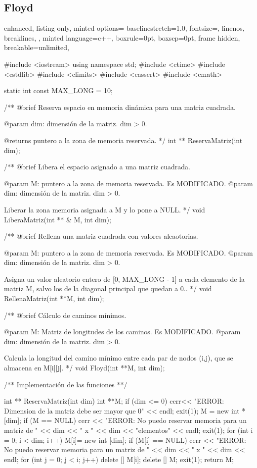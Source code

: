 \documentclass[12pt,spanish]{article}
\begin{document}
\subsection{Floyd}
\begin{multicols}{2}
\begin{tcblisting}
{
  enhanced,
  listing only,
  minted options={
    baselinestretch=1.0,
    fontsize=\footnotesize,
    linenos,
    breaklines,
  },
  minted language=c++,
  boxrule=0pt,
  boxsep=0pt,
  frame hidden,
  breakable=unlimited,
}
  
#include <iostream>
using namespace std;
#include <ctime>
#include <cstdlib>
#include <climits>
#include <cassert>
#include <cmath>

static int const MAX_LONG  = 10;
            
/**
   @brief Reserva espacio en memoria dinámica para una matriz cuadrada.
   
   @param dim: dimensión de la matriz. dim > 0.

   @returns puntero a la zona de memoria reservada.
*/
int ** ReservaMatriz(int dim);

/**
   @brief Libera el espacio asignado a una matriz cuadrada.
   
   @param M: puntero a la zona de memoria reservada. Es MODIFICADO.
   @param dim: dimensión de la matriz. dim > 0.

   Liberar la zona memoria asignada a M y lo pone a NULL.
*/
void LiberaMatriz(int ** & M, int dim);

/**
   @brief Rellena una matriz cuadrada con valores aleaotorias.
   
   @param M: puntero a la zona de memoria reservada. Es MODIFICADO.
   @param dim: dimensión de la matriz. dim > 0.

   Asigna un valor aleatorio entero de [0, MAX_LONG - 1] a cada
   elemento de la matriz M, salvo los de la diagonal principal
   que quedan a 0..
*/
void RellenaMatriz(int **M, int dim);

/**
   @brief Cálculo de caminos mínimos.
   
   @param M: Matriz de longitudes de los caminos. Es MODIFICADO.
   @param dim: dimensión de la matriz. dim > 0.

   Calcula la longitud del camino mínimo entre cada par de nodos (i,j),
   que se almacena en M[i][j].
*/
void Floyd(int **M, int dim);


/**
   Implementación de las funciones
**/

int ** ReservaMatriz(int dim)
{
  int **M;
  if (dim  <= 0)
    {
      cerr<< "\n ERROR: Dimension de la matriz debe ser mayor que 0" << endl;
      exit(1);
    }
  M = new int * [dim];
  if (M == NULL)
    {
      cerr << "\n ERROR: No puedo reservar memoria para un matriz de "
	   << dim << " x " << dim << "elementos" << endl;
      exit(1);
    }
  for (int i = 0; i < dim; i++)
    {
      M[i]= new int [dim];
      if (M[i] == NULL)
	{
	  cerr << "ERROR: No puedo reservar memoria para un matriz de "
	       << dim << " x " << dim << endl;
	  for (int j = 0; j < i; j++)
	    delete [] M[i];
	  delete [] M;
	  exit(1);
	} 
    }
  return M;
}	


\end{tcblisting}
\end{multicols}
\end{document}
